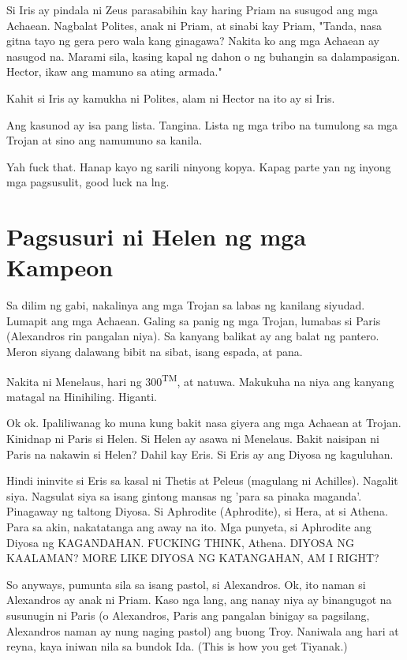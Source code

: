\documentclass[12pt,letterpaper]{report}
\begin{document}
Si Iris ay pindala ni Zeus parasabihin kay haring Priam na susugod ang mga Achaean.
Nagbalat Polites, anak ni Priam, at sinabi kay Priam, "Tanda, nasa gitna tayo ng gera pero wala kang ginagawa?
Nakita ko ang mga Achaean ay nasugod na. Marami sila, kasing kapal ng dahon o ng buhangin sa dalampasigan.
Hector, ikaw ang mamuno sa ating armada."

Kahit si Iris ay kamukha ni Polites, alam ni Hector na ito ay si Iris.

Ang kasunod ay isa pang lista. Tangina. Lista ng mga tribo na tumulong sa mga Trojan at sino ang namumuno sa kanila.

Yah fuck that. Hanap kayo ng sarili ninyong kopya. Kapag parte yan ng inyong mga pagsusulit, good luck na lng.

\pagebreak
\chapter{Pagsusuri ni Helen ng mga Kampeon}

Sa dilim ng gabi, nakalinya ang mga Trojan sa labas ng kanilang siyudad. Lumapit ang mga Achaean.
Galing sa panig ng mga Trojan, lumabas si Paris (Alexandros rin pangalan niya).
Sa kanyang balikat ay ang balat ng pantero. Meron siyang dalawang bibit na sibat, isang espada, at pana.

Nakita ni Menelaus, hari ng 300\textsuperscript{TM}, at natuwa. Makukuha na niya ang kanyang matagal na Hinihiling.
Higanti.

Ok ok. Ipaliliwanag ko muna kung bakit nasa giyera ang mga Achaean at Trojan. Kinidnap ni Paris si Helen.
Si Helen ay asawa ni Menelaus. Bakit naisipan ni Paris na nakawin si Helen?
Dahil kay Eris. Si Eris ay ang Diyosa ng kaguluhan.

Hindi ininvite si Eris sa kasal ni Thetis at Peleus (magulang ni Achilles). Nagalit siya.
Nagsulat siya sa isang gintong mansas ng 'para sa pinaka maganda'. Pinagaway ng taltong Diyosa.
Si Aphrodite (Aphrodite), si Hera, at si Athena. Para sa akin, nakatatanga ang away na ito.
Mga punyeta, si Aphrodite ang Diyosa ng KAGANDAHAN. FUCKING THINK, Athena. DIYOSA NG KAALAMAN?
MORE LIKE DIYOSA NG KATANGAHAN, AM I RIGHT?

So anyways, pumunta sila sa isang pastol, si Alexandros. Ok, ito naman si Alexandros ay anak ni Priam.
Kaso nga lang, ang nanay niya ay binangugot na susunugin ni Paris (o Alexandros, Paris ang pangalan binigay sa pagsilang, Alexandros naman ay nung naging pastol)
ang buong Troy. Naniwala ang hari at reyna, kaya iniwan nila sa bundok Ida. (This is how you get Tiyanak.)
\end{document}
